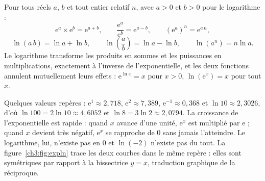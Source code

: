 \begin{propriete}
Pour tous réels $a$, $b$ et tout entier relatif $n$, avec $a > 0$ et $b > 0$ pour le logarithme :
\[
\mathrm{e}^{a} \times \mathrm{e}^{b} = \mathrm{e}^{a+b}, \qquad \frac{\mathrm{e}^{a}}{\mathrm{e}^{b}} = \mathrm{e}^{a-b}, \qquad \left(\mathrm{e}^{a}\right)^{n} = \mathrm{e}^{a\,n},
\]
\[
\ln(a\,b) = \ln a + \ln b, \qquad \ln\left(\frac{a}{b}\right) = \ln a - \ln b, \qquad \ln(a^{n}) = n \ln a.
\]
Le logarithme transforme les produits en sommes et les puissances en multiplications, exactement à l'inverse de l'exponentielle, et les deux fonctions annulent mutuellement leurs effets : $\mathrm{e}^{\ln x} = x$ pour $x > 0$, $\ln(\mathrm{e}^{x}) = x$ pour tout $x$.
\end{propriete}

Quelques valeurs repères : $\mathrm{e}^{1} \approx 2{,}718$, $\mathrm{e}^{2} \approx 7{,}389$, $\mathrm{e}^{-1} \approx 0{,}368$ et $\ln 10 \approx 2{,}3026$, d'où $\ln 100 = 2\ln 10 \approx 4{,}6052$ et $\ln 8 = 3\ln 2 \approx 2{,}0794$. La croissance de l'exponentielle est rapide : quand $x$ avance d'une unité, $\mathrm{e}^{x}$ est multiplié par $\mathrm{e}$ ; quand $x$ devient très négatif, $\mathrm{e}^{x}$ se rapproche de $0$ sans jamais l'atteindre. Le logarithme, lui, n'existe pas en $0$ et $\ln(-2)$ n'existe pas du tout. La figure~\ref{ch3:fig:expln} trace les deux courbes dans le même repère : elles sont symétriques par rapport à la bissectrice $y = x$, traduction graphique de la réciproque.

\begin{center}
\label{ch3:fig:expln}
\end{center}

